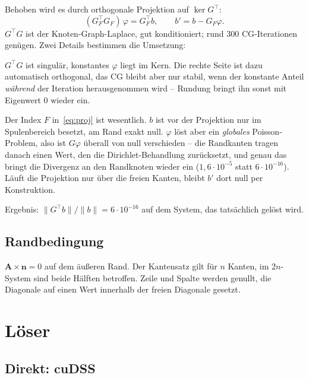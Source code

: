 \documentclass[11pt,a4paper]{article}
\begin{document}
Behoben wird es durch orthogonale Projektion auf $\ker G^{\!\top}$:
\begin{equation}
  (G_F^{\!\top} G_F)\,\varphi = G_F^{\!\top} b,
  \qquad b' = b - G_F\varphi.
  \label{eq:proj}
\end{equation}
$G^{\!\top}G$ ist der Knoten-Graph-Laplace, gut konditioniert; rund 300
CG-Iterationen genügen. Zwei Details bestimmen die Umsetzung:

\begin{description}[style=nextline,leftmargin=1em]
\item[Konstanten.] $G^{\!\top}G$ ist singulär, konstantes $\varphi$ liegt im
  Kern. Die rechte Seite ist dazu automatisch orthogonal, das CG bleibt aber
  nur stabil, wenn der konstante Anteil \emph{während} der Iteration
  herausgenommen wird -- Rundung bringt ihn sonst mit Eigenwert 0 wieder ein.
\item[Freie Kanten.] Der Index $F$ in~\eqref{eq:proj} ist wesentlich. $b$ ist
  vor der Projektion nur im Spulenbereich besetzt, am Rand exakt null. $\varphi$
  löst aber ein \emph{globales} Poisson-Problem, also ist $G\varphi$ überall von
  null verschieden -- die Randkanten tragen danach einen Wert, den die
  Dirichlet-Behandlung zurücksetzt, und genau das bringt die Divergenz an den
  Randknoten wieder ein ($1{,}6\cdot10^{-5}$ statt $6\cdot10^{-16}$). Läuft die
  Projektion nur über die freien Kanten, bleibt $b'$ dort null per
  Konstruktion.
\end{description}

Ergebnis: $\|G^{\!\top}b\|/\|b\| = 6\cdot10^{-16}$ auf dem System, das
tatsächlich gelöst wird.

\subsection{Randbedingung}

$\mathbf{A}\times\mathbf{n} = 0$ auf dem äußeren Rand. Der Kantensatz gilt für
$n$ Kanten, im $2n$-System sind beide Hälften betroffen. Zeile und Spalte
werden genullt, die Diagonale auf einen Wert innerhalb der freien Diagonale
gesetzt.

\section{Löser}

\subsection{Direkt: cuDSS}
\label{sec:cudss}
\end{document}
